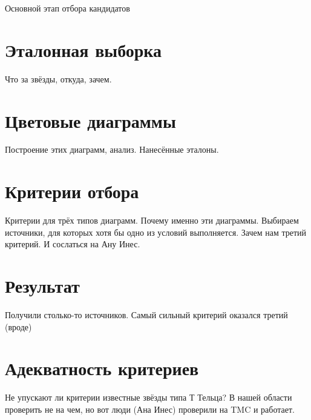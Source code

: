 Основной этап отбора кандидатов

\section{Эталонная выборка}
Что за звёзды, откуда, зачем.

\section{Цветовые диаграммы}
Построение этих диаграмм, анализ. Нанесённые эталоны.

\section{Критерии отбора}
Критерии для трёх типов диаграмм. Почему именно эти диаграммы. Выбираем источники, для которых хотя бы одно из условий выполняется. Зачем нам третий критерий. И сослаться на Ану Инес.

\section{Результат}
Получили столько-то источников. Самый сильный критерий оказался третий (вроде)

\section{Адекватность критериев}
Не упускают ли критерии известные звёзды типа Т Тельца? В нашей области проверить не на чем, но вот люди (Ана Инес) проверили на TMC и работает.
